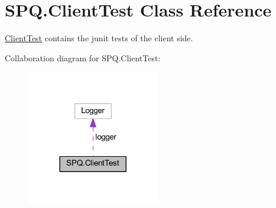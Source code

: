 \hypertarget{class_s_p_q_1_1_client_test}{}\section{S\+P\+Q.\+Client\+Test Class Reference}
\label{class_s_p_q_1_1_client_test}


\mbox{\hyperlink{class_s_p_q_1_1_client_test}{Client\+Test}} contains the junit tests of the client side.  




Collaboration diagram for S\+P\+Q.\+Client\+Test\+:
\nopagebreak
\begin{figure}[H]
\begin{center}
\leavevmode
\includegraphics[width=164pt]{class_s_p_q_1_1_client_test__coll__graph}
\end{center}
\end{figure}
